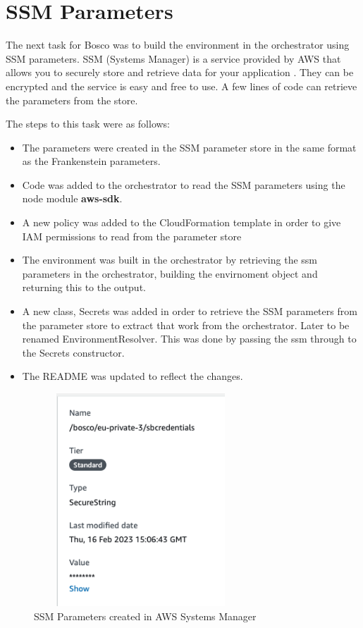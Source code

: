 \documentclass[12pt,a4paper,titlepage]{report}
\begin{document}
\section{SSM Parameters}
The next task for Bosco was to build the environment in the orchestrator using SSM parameters. 
SSM (Systems Manager) is a service provided by AWS that allows you to securely store and retrieve data for your application \cite{Halley}.
They can be encrypted and the service is easy and free to use. 
A few lines of code can retrieve the parameters from the store. 

The steps to this task were as follows:
\begin{itemize}
\item The parameters were created in the SSM parameter store in the same format as the Frankenstein parameters.
\item Code was added to the orchestrator to read the SSM parameters using the node module \textbf{aws-sdk}.
\item A new policy was added to the  CloudFormation template in order to give IAM permissions to read from the parameter store
\item The environment was built in the orchestrator by retrieving the ssm parameters in the orchestrator, building the envirnoment object and returning this to the output.
\item A new class, Secrets was added in order to retrieve the SSM parameters from the parameter store to extract that work from the orchestrator. Later to be renamed EnvironmentResolver. This was done by passing the ssm through to the Secrets constructor.
\item The README was updated to reflect the changes.
\end{itemize}

\begin{figure}[H]
 \centering
 \includegraphics[width=8cm,height=8cm,keepaspectratio]{./diagrams/ssm_params.png}
 \caption{SSM Parameters created in AWS Systems Manager}
\end{figure}
\end{document}
